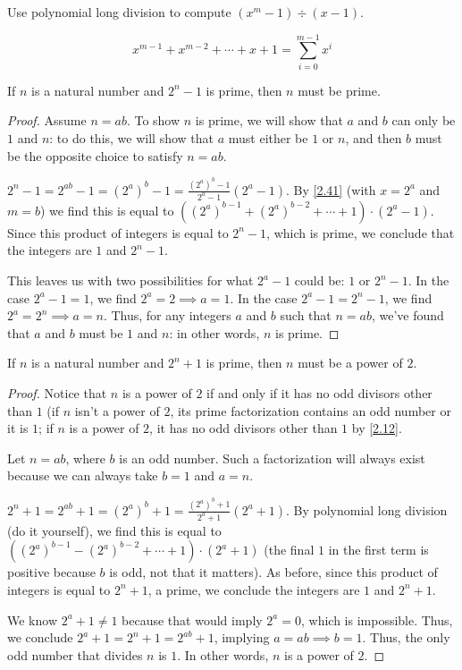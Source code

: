 \documentclass[../main.tex]{subfiles}
\begin{document}
\begin{ex} \label{2.41}
  Use polynomial long division to compute $(x^m-1) \div (x-1)$.
\end{ex}

$$x^{m-1} + x^{m-2} + \cdots + x + 1 = \sum_{i=0}^{m-1} x^i$$



\begin{thm} \label{2.42}
  If $n$ is a natural number and $2^n - 1$ is prime, then $n$ must be prime.
\end{thm}

\begin{proof}
  Assume $n = ab$. To show $n$ is prime, we will show that $a$ and $b$ can only be $1$ and $n$: to do this, we will show that $a$ must either be $1$ or $n$, and then $b$ must be the opposite choice to satisfy $n = ab$.

  $2^n - 1 = 2^{ab} - 1 = (2^a)^b - 1 = \frac{(2^a)^b - 1}{2^a - 1} (2^a - 1)$. By \ref{2.41} (with $x = 2^a$ and $m = b$) we find this is equal to $((2^a)^{b-1} + (2^a)^{b-2} + \cdots + 1) \cdot (2^a - 1)$. Since this product of integers is equal to $2^n-1$, which is prime, we conclude that the integers are $1$ and $2^n - 1$.

  This leaves us with two possibilities for what $2^a - 1$ could be: $1$ or $2^n - 1$. In the case $2^a - 1 = 1$, we find $2^a = 2 \implies a = 1$. In the case $2^a - 1 = 2^n - 1$, we find $2^a = 2^n \implies a = n$. Thus, for any integers $a$ and $b$ such that $n = ab$, we've found that $a$ and $b$ must be $1$ and $n$: in other words, $n$ is prime.
\end{proof}



\begin{thm} \label{2.43}
  If $n$ is a natural number and $2^n + 1$ is prime, then $n$ must be a power of $2$.
\end{thm}

\begin{proof}
  Notice that $n$ is a power of $2$ if and only if it has no odd divisors other than $1$ (if $n$ isn't a power of $2$, its prime factorization contains an odd number or it is $1$; if $n$ is a power of $2$, it has no odd divisors other than $1$ by \ref{2.12}.

  Let $n = ab$, where $b$ is an odd number. Such a factorization will always exist because we can always take $b = 1$ and $a = n$.

  $2^n + 1 = 2^{ab} + 1 = (2^a)^b + 1 = \frac{(2^a)^b + 1}{2^a + 1} (2^a + 1)$. By polynomial long division (do it yourself), we find this is equal to $((2^a)^{b-1} - (2^a)^{b-2} + \cdots + 1) \cdot (2^a + 1)$ (the final $1$ in the first term is positive because $b$ is odd, not that it matters). As before, since this product of integers is equal to $2^n + 1$, a prime, we conclude the integers are $1$ and $2^n + 1$.

  We know $2^a + 1 \neq 1$ because that would imply $2^a = 0$, which is impossible. Thus, we conclude $2^a + 1 = 2^n + 1 = 2^{ab} + 1$, implying $a = ab \implies b = 1$. Thus, the only odd number that divides $n$ is $1$. In other words, $n$ is a power of $2$.
\end{proof}
\end{document}

